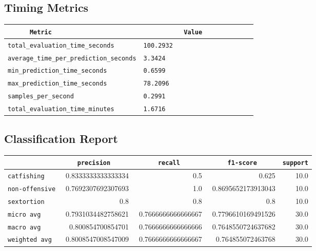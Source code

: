 \documentclass{article}
\begin{document}
\subsection{Timing Metrics}

\begin{center}
\begin{tabular}{l | l} \hline
    \verb|      Metric     | & \verb|           Value           | \\ \hline
    \hline
    \verb|total_evaluation_time_seconds| & \verb|100.2932                     | \\ \hline
    \verb|average_time_per_prediction_seconds| & \verb|3.3424                       | \\ \hline
    \verb|min_prediction_time_seconds| & \verb|0.6599                       | \\ \hline
    \verb|max_prediction_time_seconds| & \verb|78.2096                      | \\ \hline
    \verb|samples_per_second| & \verb|0.2991                       | \\ \hline
    \verb|total_evaluation_time_minutes| & \verb|1.6716                       | \\ \hline
\end{tabular}
\end{center}

\subsection{Classification Report}

\begin{center}
\begin{tabular}{l | r | r | r | r} \hline
    \verb|            | & \verb|    precision     | & \verb|      recall      | & \verb|     f1-score     | & \verb|support| \\ \hline
    \hline
    \verb|catfishing | & 0.8333333333333334 & 0.5 & 0.625 &    10.0 \\ \hline
    \verb|non-offensive| & 0.7692307692307693 & 1.0 & 0.8695652173913043 &    10.0 \\ \hline
    \verb|sextortion | & 0.8 & 0.8 & 0.8 &    10.0 \\ \hline
    \verb|micro avg  | & 0.7931034482758621 & 0.7666666666666667 & 0.7796610169491526 &    30.0 \\ \hline
    \verb|macro avg  | & 0.800854700854701 & 0.7666666666666666 & 0.7648550724637682 &    30.0 \\ \hline
    \verb|weighted avg| & 0.8008547008547009 & 0.7666666666666667 & 0.764855072463768 &    30.0 \\ \hline
\end{tabular}
\end{center}
\end{document}
